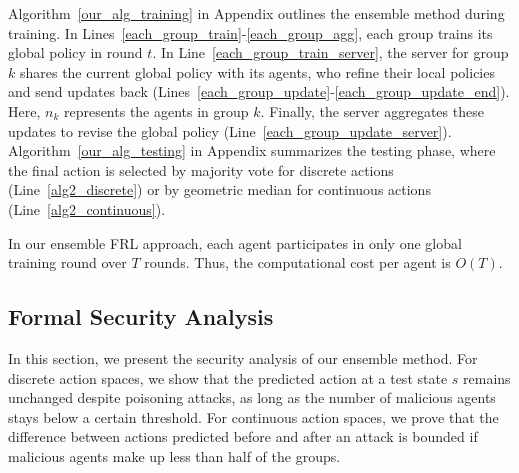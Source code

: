 %
Algorithm~\ref{our_alg_training} in Appendix outlines the ensemble method during training. In Lines~\ref{each_group_train}-\ref{each_group_agg}, each group trains its global policy in round $t$. In Line~\ref{each_group_train_server}, the server for group $k$ shares the current global policy with its agents, who refine their local policies and send updates back (Lines~\ref{each_group_update}-\ref{each_group_update_end}). Here, $n_k$ represents the agents in group $k$. Finally, the server aggregates these updates to revise the global policy (Line~\ref{each_group_update_server}). 
%
Algorithm~\ref{our_alg_testing} in Appendix summarizes the testing phase, where the final action is selected by majority vote for discrete actions (Line~\ref{alg2_discrete}) or by geometric median for continuous actions (Line~\ref{alg2_continuous}).





% 
%
In our ensemble FRL approach, each agent participates in only one global training round over $T$ rounds. Thus, the computational cost per agent is \(O(T)\).


\subsection{Formal Security Analysis}
\label{subsec:theor_any}



In this section, we present the security analysis of our ensemble method. For discrete action spaces, we show that the predicted action at a test state $s$ remains unchanged despite poisoning attacks, as long as the number of malicious agents stays below a certain threshold. For continuous action spaces, we prove that the difference between actions predicted before and after an attack is bounded if malicious agents make up less than half of the groups.



